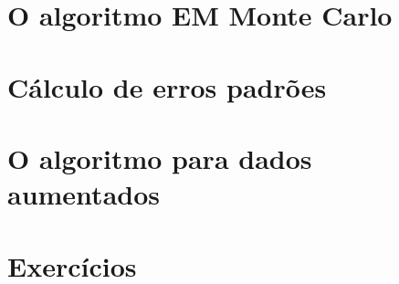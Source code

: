 \documentclass[
]{latex/krantz}
\theoremstyle{definition}
\theoremstyle{definition}
\theoremstyle{definition}
\theoremstyle{definition}
\theoremstyle{remark}
\begin{document}
\hypertarget{o-algoritmo-em-monte-carlo}{%
\section{O algoritmo EM Monte Carlo}\label{o-algoritmo-em-monte-carlo}}

\hypertarget{cuxe1lculo-de-erros-padruxf5es}{%
\section{Cálculo de erros padrões}\label{cuxe1lculo-de-erros-padruxf5es}}

\hypertarget{o-algoritmo-para-dados-aumentados}{%
\section{O algoritmo para dados aumentados}\label{o-algoritmo-para-dados-aumentados}}

\hypertarget{exercuxedcios-15}{%
\section{Exercícios}\label{exercuxedcios-15}}

\backmatter

  

\printindex
\end{document}
